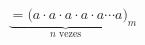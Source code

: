 \documentclass[preview]{standalone}
\begin{document}
\begin{align*}
\underbrace{=(a \cdot a \cdot a \cdot a \cdot a \cdots a}_{n \text{ vezes}})_m
\end{align*}
\end{document}
